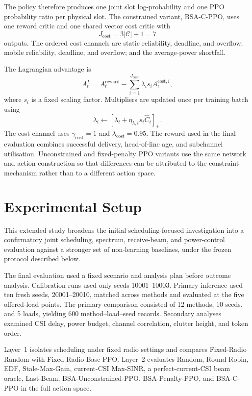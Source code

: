 \documentclass[number]{autarticle}
\begin{document}
The policy therefore produces one joint slot log-probability and one PPO probability ratio per physical slot. The constrained variant, BSA-C-PPO, uses one reward critic and one shared vector cost critic with
\begin{equation}
J_{\mathrm{cost}}=3\lvert\mathcal{C}\rvert+1=7
\end{equation}
outputs. The ordered cost channels are static reliability, deadline, and overflow; mobile reliability, deadline, and overflow; and the average-power shortfall.

The Lagrangian advantage is
\begin{equation}
A_t^{L}=A_t^{\mathrm{reward}}-
\sum_{i=1}^{J_{\mathrm{cost}}}\lambda_i s_i A_t^{\mathrm{cost},i},
\end{equation}
where $s_i$ is a fixed scaling factor. Multipliers are updated once per training batch using
\begin{equation}
\lambda_i\leftarrow\left[\lambda_i+\eta_{\lambda,i}s_i\widehat{C}_i\right]_+.
\end{equation}
The cost channel uses $\gamma_{\mathrm{cost}}=1$ and $\lambda_{\mathrm{cost}}=0.95$. The reward used in the final evaluation combines successful delivery, head-of-line age, and subchannel utilisation. Unconstrained and fixed-penalty PPO variants use the same network and action construction so that differences can be attributed to the constraint mechanism rather than to a different action space.

\section{Experimental Setup}\label{experimental-setup}
This extended study broadens the initial scheduling-focused investigation into a confirmatory joint scheduling, spectrum, receive-beam, and power-control evaluation against a stronger set of non-learning baselines, under the frozen protocol described below.

The final evaluation used a fixed scenario and analysis plan before outcome analysis. Calibration runs used only seeds 10001--10003. Primary inference used ten fresh seeds, 20001--20010, matched across methods and evaluated at the five offered-load points. The primary comparison consisted of 12 methods, 10 seeds, and 5 loads, yielding 600 method--load--seed records. Secondary analyses examined CSI delay, power budget, channel correlation, clutter height, and token order.

Layer~1 isolates scheduling under fixed radio settings and compares Fixed-Radio Random with Fixed-Radio Base PPO. Layer~2 evaluates Random, Round Robin, EDF, Stale-Max-Gain, current-CSI Max-SINR, a perfect-current-CSI beam oracle, Last-Beam, BSA-Unconstrained-PPO, BSA-Penalty-PPO, and BSA-C-PPO in the full action space.
\end{document}

